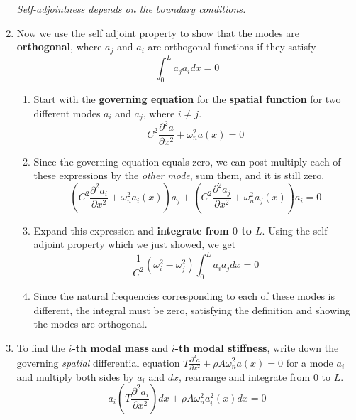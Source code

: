 \documentclass[letterpaper,twocolumn,notitlepage]{article}
\begin{document}
\begin{enumerate}
    \textit{Self-adjointness depends on the boundary conditions.}
    \item{Now we use the self adjoint property to show that the modes are \textbf{orthogonal}, where $a_{j}$ and $a_{i}$ are orthogonal functions if they satisfy}
    \begin{equation*}
      \boxed{\int_{0}^{L}a_{j}a_{i}dx=0}
    \end{equation*}
    \begin{enumerate}
      \item{Start with the \textbf{governing equation} for the \textbf{spatial function} for two different modes $a_{i}$ and $a_{j}$, where $i\neq j$.}
      \begin{equation*}
        C^{2}\frac{\partial^{2}a}{\partial x^{2}}+\omega_{n}^{2}a(x)=0
      \end{equation*}
      \item{Since the governing equation equals zero, we can post-multiply each of these expressions by the \textit{other mode}, sum them, and it is still zero.}
      \begin{equation*}
        \left(C^{2}\frac{\partial^{2}a_{i}}{\partial x^{2}}+\omega_{n}^{2}a_{i}(x)\right)a_{j}+
        \left(C^{2}\frac{\partial^{2}a_{j}}{\partial x^{2}}+\omega_{n}^{2}a_{j}(x)\right)a_{i}=0
      \end{equation*}
      \item{%
        Expand this expression and \textbf{integrate from $0$ to $L$}.
        Using the self-adjoint property which we just showed, we get
      }
      \begin{equation*}
        \boxed{\frac{1}{C^{2}}\left(\omega_{i}^{2}-\omega_{j}^{2}\right)\int_{0}^{L}a_{i}a_{j}dx=0}
      \end{equation*}
      \item{Since the natural frequencies corresponding to each of these modes is different, the integral must be zero, satisfying the definition and showing the modes are orthogonal.}
    \end{enumerate}
    \item{To find the \textbf{$i$-th modal mass} and \textbf{$i$-th modal stiffness}, write down the governing \textit{spatial} differential equation $T\frac{\partial^{2}a}{\partial x^{2}}+\rho A\omega_{n}^{2}a(x)=0$ for a mode $a_{i}$ and multiply both sides by $a_{i}$ and $dx$, rearrange and integrate from $0$ to $L$.}
    \begin{equation*}
      a_{i}\left(T\frac{\partial^{2}a_{i}}{\partial x^{2}}\right)dx+\rho A\omega_{n}^{2}a_{i}^{2}(x)dx=0

\end{equation*}
\end{enumerate}
\end{document}

